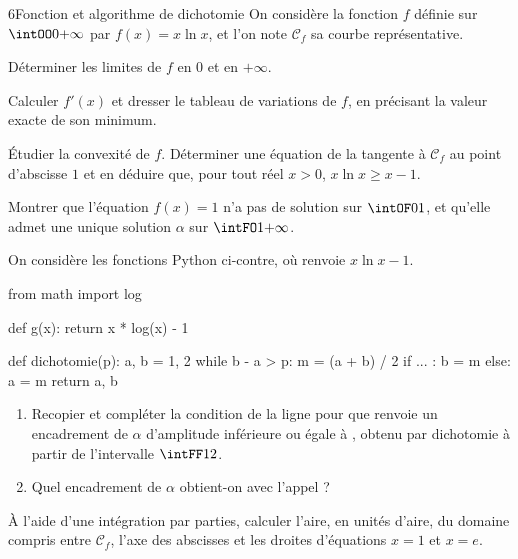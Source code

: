 \begin{exoBac}{6}{Fonction et algorithme de dichotomie}
On considère la fonction $f$ définie sur $\intOO0{+\infty}$ par $f(x)=x\ln x$, et l'on note $\mathcal{C}_f$ sa courbe représentative.
\begin{questions}
  \item Déterminer les limites de $f$ en $0$ et en $+\infty$.
  \item Calculer $f'(x)$ et dresser le tableau de variations de $f$, en précisant la valeur exacte de son minimum.
  \item Étudier la convexité de $f$. Déterminer une équation de la tangente à $\mathcal{C}_f$ au point d'abscisse $1$ et en déduire que,
    pour tout réel $x>0$, $x\ln x\geq x-1$.
\end{questions}
\begin{questions}[resume]
  \item Montrer que l'équation $f(x)=1$ n'a pas de solution sur $\intOF01$, et qu'elle admet une unique solution $\alpha$ sur
    $\intFO1{+\infty}$.
  \item On considère les fonctions Python ci-contre, où  renvoie $x\ln x-1$.
\begin{codecote}[0.46]
\begin{pythoncol}
from math import log

def g(x):
    return x * log(x) - 1

def dichotomie(p):
    a, b = 1, 2
    while b - a > p:
        m = (a + b) / 2
        if ... :
            b = m
        else:
            a = m
    return a, b
\end{pythoncol}
\cote
\begin{enumerate}[label=\alph*),leftmargin=1.4em,itemsep=0.6mm,topsep=0mm]
  \item Recopier et compléter la condition de la ligne  pour que  renvoie un encadrement de $\alpha$
    d'amplitude inférieure ou égale à , obtenu par dichotomie à partir de l'intervalle $\intFF12$.
  \item Quel encadrement de $\alpha$ obtient-on avec l'appel  ?
\end{enumerate}
\end{codecote}
  \item À l'aide d'une intégration par parties, calculer l'aire, en unités d'aire, du domaine compris entre $\mathcal{C}_f$, l'axe des
    abscisses et les droites d'équations $x=1$ et $x=e$.
\end{questions}
\end{exoBac}

